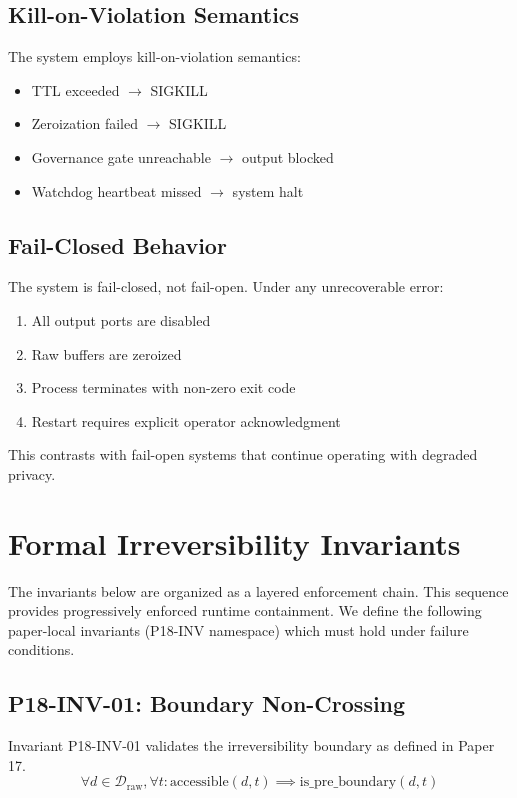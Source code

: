\documentclass[conference]{IEEEtran}
\begin{document}
\subsection{Kill-on-Violation Semantics}
The system employs kill-on-violation semantics:
\begin{itemize}
    \item TTL exceeded $\rightarrow$ SIGKILL
    \item Zeroization failed $\rightarrow$ SIGKILL
    \item Governance gate unreachable $\rightarrow$ output blocked
    \item Watchdog heartbeat missed $\rightarrow$ system halt
\end{itemize}

\subsection{Fail-Closed Behavior}
The system is fail-closed, not fail-open. Under any unrecoverable error:
\begin{enumerate}
    \item All output ports are disabled
    \item Raw buffers are zeroized
    \item Process terminates with non-zero exit code
    \item Restart requires explicit operator acknowledgment
\end{enumerate}

This contrasts with fail-open systems that continue operating with degraded privacy.

\section{Formal Irreversibility Invariants}
The invariants below are organized as a layered enforcement chain. This sequence provides progressively enforced runtime containment. We define the following paper-local invariants (P18-INV namespace) which must hold under failure conditions.

\subsection{P18-INV-01: Boundary Non-Crossing}
Invariant P18-INV-01 validates the irreversibility boundary as defined in Paper 17.
\begin{equation}
\forall d \in \mathcal{D}_{\mathrm{raw}}, \forall t: \mathrm{accessible}(d, t) \implies \mathrm{is\_pre\_boundary}(d, t)
\end{equation}
\end{document}
